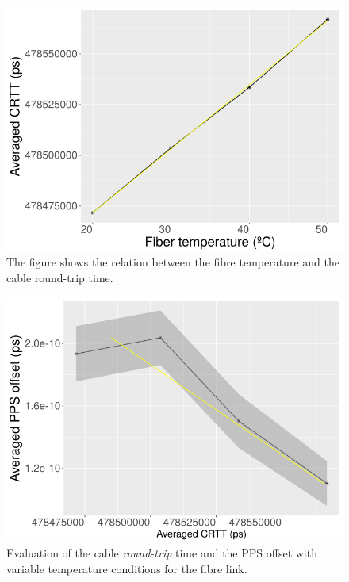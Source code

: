 

	
\begin{figure}[t]
	\centering
	\includegraphics[width=0.7\linewidth]{img/crttvstemp}
	\caption[CRTT vs. Fibre temperature]{The figure shows the relation 
	between the fibre temperature and the cable round-trip time.}
	\label{fig:crttvstemp}
\end{figure}

\begin{figure}[t]
	\centering
	\includegraphics[width=0.7\linewidth]{img/ppsvscrtt}
	\caption{Evaluation of the cable \textit{round-trip} time and the PPS 
	offset with variable temperature conditions for the fibre 
	link.}
	\label{fig:ppsvscrtt}
\end{figure}

